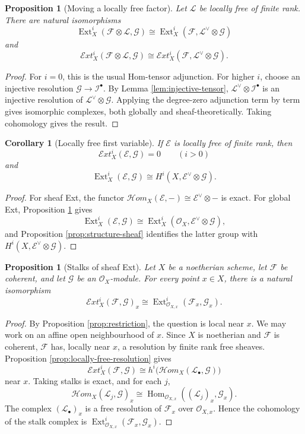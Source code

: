 \documentclass[11pt,a4paper]{article}
\numberwithin{equation}{section}
\theoremstyle{plain}
\newtheorem{proposition}[theorem]{Proposition}
\newtheorem{corollary}[theorem]{Corollary}
\theoremstyle{definition}
\theoremstyle{remark}
\newcommand{\OO}{\mathcal O}
\newcommand{\F}{\mathcal F}
\newcommand{\G}{\mathcal G}
\newcommand{\E}{\mathcal E}
\newcommand{\LL}{\mathcal L}
\newcommand{\I}{\mathcal I}
\DeclareMathOperator{\Ext}{Ext}
\DeclareMathOperator{\Hom}{Hom}
\newcommand{\sExt}{\mathcal{E}\!xt}
\newcommand{\sHom}{\mathcal{H}\!om}
\begin{document}
\begin{proposition}[Moving a locally free factor]\label{prop:moving-locally-free-factor}
Let \(\LL\) be locally free of finite rank.  There are natural isomorphisms
\[
  \Ext_X^i(\F\otimes\LL,\G)
  \cong
  \Ext_X^i(\F,\LL^\vee\otimes\G)
\]
and
\[
  \sExt_X^i(\F\otimes\LL,\G)
  \cong
  \sExt_X^i(\F,\LL^\vee\otimes\G).
\]
\end{proposition}

\begin{proof}
For \(i=0\), this is the usual Hom-tensor adjunction.  For higher \(i\), choose an injective resolution \(\G\to\I^\bullet\).  By Lemma \ref{lem:injective-tensor}, \(\LL^\vee\otimes\I^\bullet\) is an injective resolution of \(\LL^\vee\otimes\G\).  Applying the degree-zero adjunction term by term gives isomorphic complexes, both globally and sheaf-theoretically.  Taking cohomology gives the result.
\end{proof}

\begin{corollary}[Locally free first variable]\label{cor:locally-free-first-variable}
If \(\E\) is locally free of finite rank, then
\[
  \sExt_X^i(\E,\G)=0\qquad(i>0)
\]
and
\[
  \Ext_X^i(\E,\G)
  \cong
  H^i(X,\E^\vee\otimes\G).
\]
\end{corollary}

\begin{proof}
For sheaf Ext, the functor \(\sHom_X(\E,-)\cong \E^\vee\otimes -\) is exact.  For global Ext, Proposition \ref{prop:moving-locally-free-factor} gives
\[
  \Ext_X^i(\E,\G)
  \cong
  \Ext_X^i(\OO_X,\E^\vee\otimes\G),
\]
and Proposition \ref{prop:structure-sheaf} identifies the latter group with \(H^i(X,\E^\vee\otimes\G)\).
\end{proof}

\begin{proposition}[Stalks of sheaf Ext]\label{prop:stalks}
Let \(X\) be a noetherian scheme, let \(\F\) be coherent, and let \(\G\) be an \(\OO_X\)-module.  For every point \(x\in X\), there is a natural isomorphism
\[
  \sExt_X^i(\F,\G)_x
  \cong
  \Ext_{\OO_{X,x}}^i(\F_x,\G_x).
\]
\end{proposition}

\begin{proof}
By Proposition \ref{prop:restriction}, the question is local near \(x\).  We may work on an affine open neighbourhood of \(x\).  Since \(X\) is noetherian and \(\F\) is coherent, \(\F\) has, locally near \(x\), a resolution by finite rank free sheaves.  Proposition \ref{prop:locally-free-resolution} gives
\[
  \sExt_X^i(\F,\G)
  \cong
  h^i\bigl(\sHom_X(\LL_\bullet,\G)\bigr)
\]
near \(x\).  Taking stalks is exact, and for each \(j\),
\[
  \sHom_X(\LL_j,\G)_x
  \cong
  \Hom_{\OO_{X,x}}((\LL_j)_x,\G_x).
\]
The complex \((\LL_\bullet)_x\) is a free resolution of \(\F_x\) over \(\OO_{X,x}\).  Hence the cohomology of the stalk complex is \(\Ext_{\OO_{X,x}}^i(\F_x,\G_x)\).
\end{proof}
\end{document}
